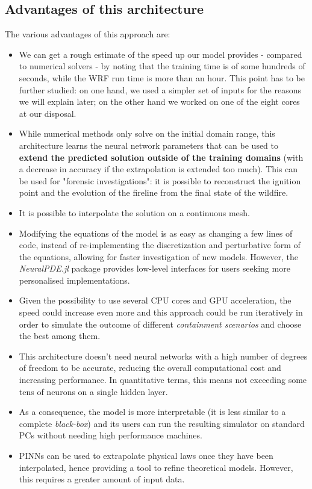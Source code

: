 \documentclass{juliacon}
\begin{document}
\subsection{Advantages of this architecture}\label{advantages}
The various advantages of this approach are:

\begin{itemize}
    \itemsep0em 
    \item We can get a rough estimate of the speed up our model provides - compared to numerical solvers - by noting that the training time is of some hundreds of seconds, while the WRF run time is more than an hour. This point has to be further studied: on one hand, we used a simpler set of inputs for the reasons we will explain later; on the other hand we worked on one of the eight cores at our disposal.
    \item While numerical methods only solve on the initial domain range, this architecture learns the neural network parameters that can be used to \textbf{extend the predicted solution outside of the training domains} (with a decrease in accuracy if the extrapolation is extended too much). This can be used for "forensic investigations": it is possible to reconstruct the ignition point and the evolution of the fireline from the final state of the wildfire.
    \item It is possible to interpolate the solution on a continuous mesh.
    \item Modifying the equations of the model is as easy as changing a few lines of code, instead of re-implementing the discretization and perturbative form of the equations, allowing for faster investigation of new models. However, the \textit{NeuralPDE.jl} package provides low-level interfaces for users seeking more personalised implementations.
    \item Given the possibility to use several CPU cores and GPU acceleration, the speed could increase even more and this approach could be run iteratively in order to simulate the outcome of different \textit{containment scenarios} and choose the best among them.
    \item This architecture doesn't need neural networks with a high number of degrees of freedom to be accurate, reducing the overall computational cost and increasing performance. In quantitative terms, this means not exceeding some tens of neurons on a single hidden layer. 
    \item As a consequence, the model is more interpretable (it is less similar to a complete \textit{black-box}) and its users can run the resulting simulator on standard PCs without needing high performance machines.
    \item PINNs can be used to extrapolate physical laws once they have been interpolated, hence providing a tool to refine theoretical models. However, this requires a greater amount of input data.
\end{itemize}
\end{document}
